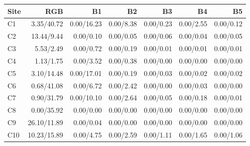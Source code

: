 \begin{tabular*}{\textwidth}{@{\extracolsep{\fill}}lrrrrrr@{}}
\toprule
Site & RGB & B1 & B2 & B3 & B4 & B5 \\
\midrule
C1 & 3.35/40.72 & 0.00/16.23 & 0.00/8.38 & 0.00/0.23 & 0.00/2.55 & 0.00/0.12 \\
C2 & 13.44/9.44 & 0.00/0.10 & 0.00/0.05 & 0.00/0.06 & 0.00/0.04 & 0.00/0.05 \\
C3 & 5.53/2.49 & 0.00/0.72 & 0.00/0.19 & 0.00/0.01 & 0.00/0.01 & 0.00/0.01 \\
C4 & 1.13/1.75 & 0.00/3.52 & 0.00/0.38 & 0.00/0.00 & 0.00/0.00 & 0.00/0.00 \\
C5 & 3.10/14.48 & 0.00/17.01 & 0.00/0.19 & 0.00/0.03 & 0.00/0.02 & 0.00/0.02 \\
C6 & 0.68/41.08 & 0.00/6.72 & 0.00/2.42 & 0.00/0.00 & 0.00/0.03 & 0.00/0.00 \\
C7 & 0.90/31.79 & 0.00/10.10 & 0.00/2.64 & 0.00/0.05 & 0.00/0.18 & 0.00/0.01 \\
C8 & 0.00/35.92 & 0.00/0.00 & 0.00/0.00 & 0.00/0.00 & 0.00/0.00 & 0.00/0.00 \\
C9 & 26.10/11.89 & 0.00/0.04 & 0.00/0.00 & 0.00/0.00 & 0.00/0.00 & 0.00/0.00 \\
C10 & 10.23/15.89 & 0.00/4.75 & 0.00/2.59 & 0.00/1.11 & 0.00/1.65 & 0.00/1.06 \\
\bottomrule
\end{tabular*}
